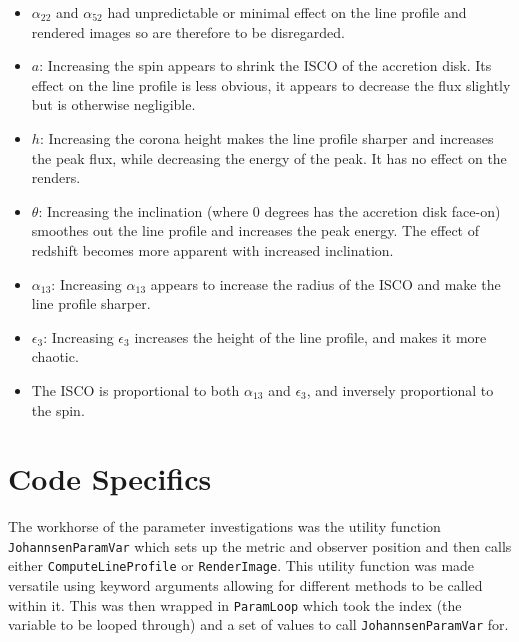 \documentclass[
  letterpaper,
  DIV=11,
  numbers=noendperiod]{scrreprt}
\providecommand{\tightlist}{%
  \setlength{\itemsep}{0pt}\setlength{\parskip}{0pt}}
\begin{document}
\begin{tcolorbox}[enhanced jigsaw, arc=.35mm, bottomrule=.15mm, bottomtitle=1mm, breakable, colback=white, colbacktitle=quarto-callout-important-color!10!white, colframe=quarto-callout-important-color-frame, coltitle=black, left=2mm, leftrule=.75mm, opacityback=0, opacitybacktitle=0.6, rightrule=.15mm, title=\textcolor{quarto-callout-important-color}{\faExclamation}\hspace{0.5em}{Summary}, titlerule=0mm, toprule=.15mm, toptitle=1mm]

\begin{itemize}
\tightlist
\item
  \(\alpha_{22}\) and \(\alpha_{52}\) had unpredictable or minimal
  effect on the line profile and rendered images so are therefore to be
  disregarded.
\item
  \(a\): Increasing the spin appears to shrink the ISCO of the accretion
  disk. Its effect on the line profile is less obvious, it appears to
  decrease the flux slightly but is otherwise negligible.
\item
  \(h\): Increasing the corona height makes the line profile sharper and
  increases the peak flux, while decreasing the energy of the peak. It
  has no effect on the renders.
\item
  \(\theta\): Increasing the inclination (where 0 degrees has the
  accretion disk face-on) smoothes out the line profile and increases
  the peak energy. The effect of redshift becomes more apparent with
  increased inclination.
\item
  \(\alpha_{13}\): Increasing \(\alpha_{13}\) appears to increase the
  radius of the ISCO and make the line profile sharper.
\item
  \(\epsilon_3\): Increasing \(\epsilon_3\) increases the height of the
  line profile, and makes it more chaotic.
\item
  The ISCO is proportional to both \(\alpha_{13}\) and \(\epsilon_3\),
  and inversely proportional to the spin.
\end{itemize}

\end{tcolorbox}

\section{Code Specifics}\label{code-specifics}

The workhorse of the parameter investigations was the utility function
\texttt{JohannsenParamVar} which sets up the metric and observer
position and then calls either \texttt{ComputeLineProfile} or
\texttt{RenderImage}. This utility function was made versatile using
keyword arguments allowing for different methods to be called within it.
This was then wrapped in \texttt{ParamLoop} which took the index (the
variable to be looped through) and a set of values to call
\texttt{JohannsenParamVar} for.
\end{document}
